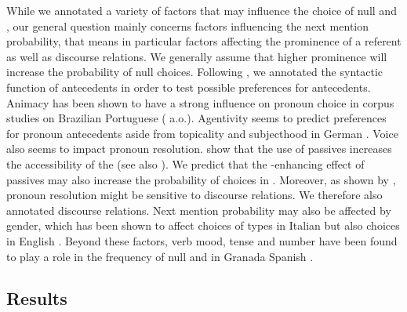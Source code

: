 \documentclass[output=paper,colorlinks,citecolor=brown]{langscibook}
\begin{document}
While we  annotated a variety of factors that may influence the choice of null and , our general question mainly concerns factors influencing the next mention probability, that means in particular factors affecting the prominence of a referent as well as discourse relations. We generally assume that higher prominence will increase the probability of null  choices. Following \citet{carminati2002processing}, we annotated the syntactic function of antecedents in order to test possible preferences for  antecedents. 
Animacy has been shown to have a strong influence on pronoun choice in corpus studies on Brazilian Portuguese (\citealt{soares2020effect, duarte2000loss} a.o.). Agentivity seems to predict preferences for pronoun antecedents aside from topicality and subjecthood in German \citep{schumacher2016thematic}.
Voice also seems to impact pronoun resolution. \citet{colonna2018effects} show that the use of passives increases the  accessibility of the   (see also \citealt{d1973some, burmester2018sensitivity}). We predict that the -enhancing effect of passives may also increase the probability of  choices in . 
Moreover, as shown by \citet{rohde2014grammatical}, pronoun resolution might be sensitive to discourse relations. We therefore also annotated  discourse relations.
Next mention probability may also be affected by 
gender, which has been shown to affect choices of  types in Italian \citep{cacciari2011pronoun} but also  choices in English \citep{ferstl2011implicit}.
Beyond these factors, verb mood, tense and number have been found to play a role in the frequency of null and  in Granada Spanish \citep{manjon2016factores}. 

\subsection{Results}
\end{document}
